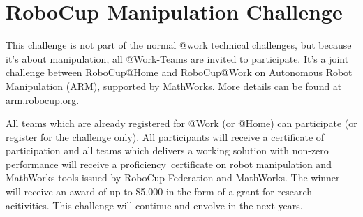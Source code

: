 \newpage
\section{RoboCup Manipulation Challenge}

This challenge is not part of the normal @work technical challenges, but because it's about manipulation, all @Work-Teams are invited to participate. It's a joint challenge between RoboCup@Home and RoboCup@Work on
Autonomous Robot Manipulation (ARM), supported by MathWorks. More details can be found  at \url{arm.robocup.org}.

All teams which are already registered for @Work (or @Home) can participate (or register for the challenge only). All participants will receive a certificate of participation and all teams which delivers a working solution with non-zero performance will receive a \grqq proficiency\grqq \ certificate on robot manipulation and MathWorks tools issued by RoboCup Federation and MathWorks. The winner will receive an award of up to \$5,000 in the form of a grant for research acitivities. This challenge will continue and envolve in the next years.